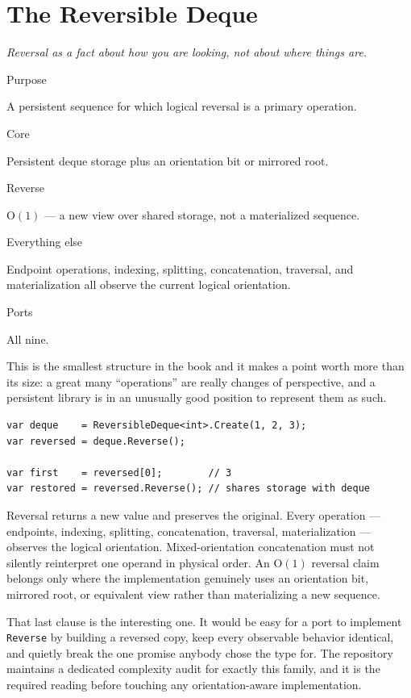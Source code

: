 \documentclass[11pt,twoside,openright]{book}
\newcommand{\code}[1]{\texorpdfstring{\textcolor{d7ink}{\texttt{#1}}}{#1}}
\newcommand{\bigoh}[1]{$\mathrm{O}(#1)$}
\newcommand{\motto}[1]{%
  \begingroup
  \vspace{-4pt}\hfill\begin{minipage}{0.80\textwidth}
    \raggedleft\itshape\color{d7slate}\small #1\par
  \end{minipage}\par\vspace{18pt}
  \endgroup}
\newcommand{\spec}[2]{%
  \par\noindent
  \parbox[t]{0.21\linewidth}{\raggedright\sffamily\bfseries\footnotesize
    \color{d7slate}\strut #1}%
  \hspace{9pt}%
  \parbox[t]{\dimexpr0.79\linewidth-9pt\relax}{\raggedright\strut #2}%
  \par\vspace{3.5pt}}
\newenvironment{specimen}[1][Specimen]
  {\begin{glancebox}[#1]\small\setlength{\parindent}{0pt}}
  {\end{glancebox}}
\begin{document}
\chapter{The Reversible Deque}
\label{ch:revdeque}

\motto{Reversal as a fact about how you are looking, not about where things
are.}

\begin{specimen}[Specimen --- \code{ReversibleDeque}]
%
\spec{Purpose}{A persistent sequence for which logical reversal is a primary operation.}
\spec{Core}{Persistent deque storage plus an orientation bit or mirrored root.}
\spec{Reverse}{\bigoh{1} --- a new view over shared storage, not a materialized sequence.}
\spec{Everything else}{Endpoint operations, indexing, splitting, concatenation, traversal, and materialization all observe the current logical orientation.}
\spec{Ports}{All nine.}
\end{specimen}

\noindent
This is the smallest structure in the book and it makes a point worth more than
its size: a great many ``operations'' are really changes of perspective, and
a persistent library is in an unusually good position to represent them as such.

\begin{lstlisting}[language={[Sharp]C}]
var deque    = ReversibleDeque<int>.Create(1, 2, 3);
var reversed = deque.Reverse();

var first    = reversed[0];        // 3
var restored = reversed.Reverse(); // shares storage with deque
\end{lstlisting}

\begin{contractbox}
Reversal returns a new value and preserves the original. Every operation ---
endpoints, indexing, splitting, concatenation, traversal, materialization ---
observes the logical orientation. Mixed-orientation concatenation must not
silently reinterpret one operand in physical order. An \bigoh{1} reversal claim
belongs only where the implementation genuinely uses an orientation bit,
mirrored root, or equivalent view rather than materializing a new sequence.
\end{contractbox}

That last clause is the interesting one. It would be easy for a port to
implement \code{Reverse} by building a reversed copy, keep every observable
behavior identical, and quietly break the one promise anybody chose the type
for. The repository maintains a dedicated complexity audit for exactly this
family, and it is the required reading before touching any orientation-aware
implementation.
\end{document}
